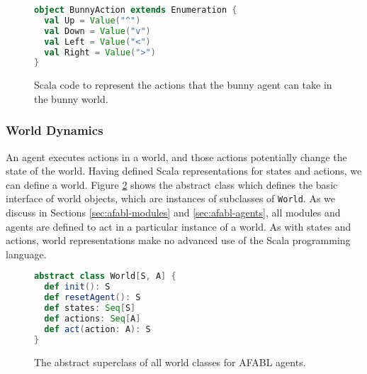 \begin{figure}[!h]
\begin{center}

\begin{lstlisting}[language=Scala]
object BunnyAction extends Enumeration {
  val Up = Value("^")
  val Down = Value("v")
  val Left = Value("<")
  val Right = Value(">")
}
\end{lstlisting}

\caption{Scala code to represent the actions that the bunny agent can take in the bunny world.}
\end{center}
\label{fig:bunny-action-code}
\end{figure}

\subsubsection{World Dynamics}

An agent executes actions in a world, and those actions potentially change the state of the world. Having defined Scala representations for states and actions, we can define a world. Figure \ref{fig:world-code} shows the abstract class which defines the basic interface of world objects, which are instances of subclasses of {\tt World}. As we discuss in Sections \ref{sec:afabl-modules} and \ref{sec:afabl-agents}, all modules and agents are defined to act in a particular instance of a world. As with states and actions, world representations make no advanced use of the Scala programming language.

\begin{figure}[!h]
\begin{center}
\small
\begin{lstlisting}[language=Scala]
abstract class World[S, A] {
  def init(): S
  def resetAgent(): S
  def states: Seq[S]
  def actions: Seq[A]
  def act(action: A): S
}
\end{lstlisting}
\normalsize
\caption{The abstract superclass of all world classes for AFABL agents.}
\end{center}
\label{fig:world-code}
\end{figure}



